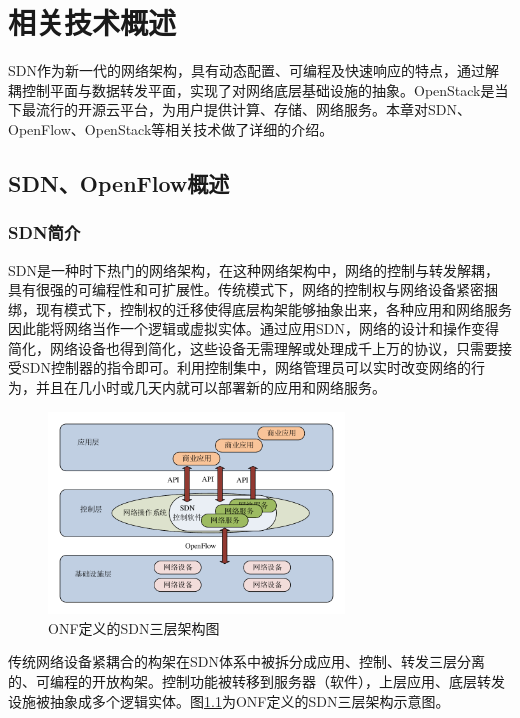 
\chapter{相关技术概述}
SDN作为新一代的网络架构，具有动态配置、可编程及快速响应的特点，通过解耦控制平面与数据转发平面，实现了对网络底层基础设施的抽象。OpenStack是当下最流行的开源云平台，为用户提供计算、存储、网络服务。本章对SDN、OpenFlow、OpenStack等相关技术做了详细的介绍。
\section{SDN、OpenFlow概述}
\subsection{SDN简介}
SDN是一种时下热门的网络架构，在这种网络架构中，网络的控制与转发解耦，具有很强的可编程性和可扩展性。传统模式下，网络的控制权与网络设备紧密捆绑，现有模式下，控制权的迁移使得底层构架能够抽象出来，各种应用和网络服务因此能将网络当作一个逻辑或虚拟实体。通过应用SDN，网络的设计和操作变得简化，网络设备也得到简化，这些设备无需理解或处理成千上万的协议，只需要接受SDN控制器的指令即可。利用控制集中，网络管理员可以实时改变网络的行为，并且在几小时或几天内就可以部署新的应用和网络服务\cite{SDN-3}。

\begin{figure}[!htb]
  \centering
  \includegraphics[width=0.7\textwidth]{logo/sdn}
  \caption{ONF定义的SDN三层架构图}
  \label{fig:sdn}
\end{figure}

传统网络设备紧耦合的构架在SDN体系中被拆分成应用、控制、转发三层分离的、可编程的开放构架。控制功能被转移到服务器（软件），上层应用、底层转发设施被抽象成多个逻辑实体。图\ref{fig:sdn}为ONF定义的SDN三层架构示意图\cite{SDN-2}。

